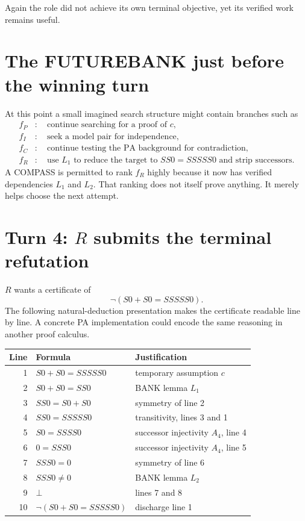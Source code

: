 \documentclass[11pt,openany]{book}
\theoremstyle{definition}
\theoremstyle{remark}
\begin{document}
Again the role did not achieve its own terminal objective, yet its verified work remains useful.

\section{The FUTUREBANK just before the winning turn}
At this point a small imagined search structure might contain branches such as
\begin{align*}
f_P&:\quad \text{continue searching for a proof of }c,\\
f_I&:\quad \text{seek a model pair for independence},\\
f_C&:\quad \text{continue testing the PA background for contradiction},\\
f_R&:\quad \text{use }L_1\text{ to reduce the target to }SS0=SSSSS0\text{ and strip successors}.
\end{align*}
A COMPASS is permitted to rank $f_R$ highly because it now has verified dependencies $L_1$ and $L_2$. That ranking does not itself prove anything. It merely helps choose the next attempt.

\section{Turn 4: \texorpdfstring{$R$}{R} submits the terminal refutation}
$R$ wants a certificate of
\[
\neg(S0+S0=SSSSS0).
\]
The following natural-deduction presentation makes the certificate readable line by line. A concrete PA implementation could encode the same reasoning in another proof calculus.

\begin{center}
\begin{tabularx}{0.94\textwidth}{@{}rXl@{}}
\toprule
\textbf{Line} & \textbf{Formula} & \textbf{Justification}\\
\midrule
1 & $S0+S0=SSSSS0$ & temporary assumption $c$\\
2 & $S0+S0=SS0$ & BANK lemma $L_1$\\
3 & $SS0=S0+S0$ & symmetry of line 2\\
4 & $SS0=SSSSS0$ & transitivity, lines 3 and 1\\
5 & $S0=SSSS0$ & successor injectivity $A_4$, line 4\\
6 & $0=SSS0$ & successor injectivity $A_4$, line 5\\
7 & $SSS0=0$ & symmetry of line 6\\
8 & $SSS0\neq0$ & BANK lemma $L_2$\\
9 & $\bot$ & lines 7 and 8\\
10 & $\neg(S0+S0=SSSSS0)$ & discharge line 1\\
\bottomrule
\end{tabularx}
\end{center}
\end{document}
